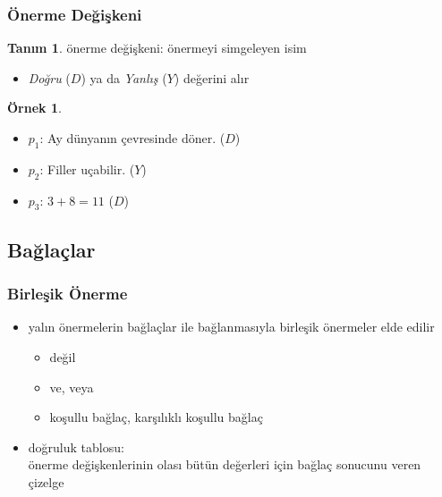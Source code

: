 \documentclass[dvipsnames]{beamer}
\theoremstyle{definition}
\newtheorem{tanim}[theorem]{Tanım}
\theoremstyle{example}
\newtheorem{ornek}[theorem]{Örnek}
\theoremstyle{plain}
\begin{document}
\begin{frame}
  \frametitle{Önerme Değişkeni}

  \begin{tanim}
    \alert{önerme değişkeni}: önermeyi simgeleyen isim

    \begin{itemize}
      \item \emph{Doğru} ($D$) ya da \emph{Yanlış} ($Y$) değerini alır
    \end{itemize}
  \end{tanim}

  \pause
  \begin{ornek}
    \begin{itemize}
      \item $p_1$: Ay dünyanın çevresinde döner. ($D$)
      \item $p_2$: Filler uçabilir. ($Y$)
      \item $p_3$: $3+8=11$ ($D$)
    \end{itemize}
  \end{ornek}
\end{frame}

\subsection{Bağlaçlar}

\begin{frame}
  \frametitle{Birleşik Önerme}

  \begin{itemize}
    \item yalın önermelerin \alert{bağlaçlar} ile bağlanmasıyla
      \alert{birleşik önermeler} elde edilir
    \begin{itemize}
      \item değil
      \item ve, veya
      \item koşullu bağlaç, karşılıklı koşullu bağlaç
    \end{itemize}
  \end{itemize}

  \pause
  \begin{itemize}
    \item \alert{doğruluk tablosu}:\\
      önerme değişkenlerinin olası bütün değerleri için bağlaç sonucunu veren
      çizelge
  \end{itemize}
\end{frame}
\end{document}
